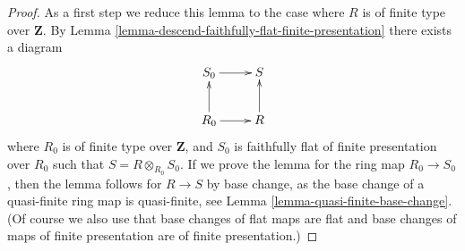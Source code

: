 \begin{proof}
As a first step we reduce this lemma to the case where $R$ is of finite
type over $\mathbf{Z}$.
By Lemma \ref{lemma-descend-faithfully-flat-finite-presentation}
there exists a diagram
$$
\xymatrix{
S_0 \ar[r] & S \\
R_0 \ar[u] \ar[r] & R \ar[u]
}
$$
where $R_0$ is of finite type over $\mathbf{Z}$,
and $S_0$ is faithfully flat of finite presentation over $R_0$
such that $S = R \otimes_{R_0} S_0$.
If we prove the lemma for the ring map $R_0 \to S_0$, then the lemma
follows for $R \to S$ by base change, as the base change of
a quasi-finite ring map is quasi-finite, see
Lemma \ref{lemma-quasi-finite-base-change}. (Of course we
also use that base changes of flat maps are flat and
base changes of maps of finite presentation are of finite presentation.)


\end{proof}
